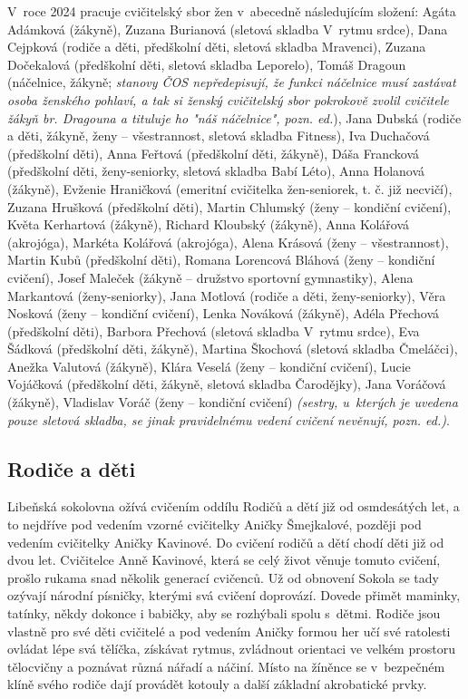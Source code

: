\documentclass[a5paper, 11pt, twoside]{article}
\begin{document}
V~roce 2024 pracuje cvičitelský sbor žen v~abecedně následujícím
složení: Agáta Adámková (žákyně), Zuzana Burianová (sletová skladba
V~rytmu srdce), Dana Cejpková (rodiče a děti, předškolní děti, sletová
skladba Mravenci), Zuzana Dočekalová (předškolní děti, sletová skladba
Leporelo), Tomáš Dragoun (náčelnice, žákyně; \textit{stanovy ČOS
nepředepisují, že funkci náčelnice musí zastávat osoba ženského pohlaví,
a tak si ženský cvičitelský sbor pokrokově zvolil cvičitele žákyň br.
Dragouna a tituluje ho "náš náčelnice", pozn. ed.}), Jana Dubská
(rodiče a děti, žákyně, ženy -- všestrannost, sletová skladba Fitness),
Iva Duchačová (předškolní děti), Anna Feřtová (předškolní děti, žákyně),
Dáša Francková (předškolní děti, ženy-seniorky, sletová skladba Babí
Léto), Anna Holanová (žákyně), Evženie Hraničková (emeritní cvičitelka
žen-seniorek, t. č. již necvičí), Zuzana Hrušková (předškolní děti),
Martin Chlumský (ženy -- kondiční cvičení), Květa Kerhartová
(žákyně), Richard Kloubský (žákyně), Anna Kolářová (akrojóga), Markéta
Kolářová (akrojóga), Alena Krásová (ženy -- všestrannost), Martin Kubů
(předškolní děti), Romana Lorencová Bláhová (ženy -- kondiční cvičení),
Josef Maleček (žákyně -- družstvo sportovní gymnastiky), Alena
Markantová (ženy-seniorky), Jana Motlová (rodiče a děti,
ženy-seniorky), Věra Nosková (ženy -- kondiční cvičení), Lenka Nováková
(žákyně), Adéla Přechová (předškolní děti), Barbora Přechová (sletová
skladba V~rytmu srdce), Eva Šádková (předškolní děti, žákyně), Martina
Škochová (sletová skladba Čmeláčci), Anežka Valutová (žákyně), Klára
Veselá (ženy -- kondiční cvičení), Lucie Vojáčková (předškolní děti,
žákyně, sletová skladba Čarodějky), Jana Voráčová (žákyně), Vladislav
Voráč (ženy -- kondiční cvičení) \textit{(sestry, u~kterých je uvedena
pouze sletová skladba, se jinak pravidelnému vedení cvičení nevěnují,
pozn. ed.)}.

\subsection{Rodiče a děti}

Libeňská sokolovna ožívá cvičením oddílu Rodičů a dětí již od
osmdesátých let, a to nejdříve pod vedením vzorné cvičitelky Aničky
Šmejkalové, později pod vedením cvičitelky Aničky Kavinové. Do cvičení
rodičů a dětí chodí děti již od dvou let. Cvičitelce Anně Kavinové,
která se celý život věnuje tomuto cvičení, prošlo rukama snad několik
generací cvičenců. Už od obnovení Sokola se tady ozývají národní
písničky, kterými svá cvičení doprovází. Dovede přimět maminky, tatínky,
někdy dokonce i babičky, aby se rozhýbali spolu s~dětmi. Rodiče jsou
vlastně pro své děti cvičitelé a pod vedením Aničky formou her učí své
ratolesti ovládat lépe svá tělíčka, získávat rytmus, zvládnout orientaci
ve velkém prostoru tělocvičny a poznávat různá nářadí a náčiní. Místo na
žíněnce se v~bezpečném klíně svého rodiče dají provádět kotouly a další
základní akrobatické prvky.
\end{document}
